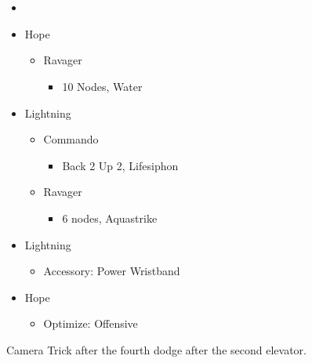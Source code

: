 \chapter[Chapter 5]{}


\renewcommand{\first}{[1] Slash \& Burn (\rav/\com)}
\renewcommand{\second}{[2] War \& Peace (\med/\com)}
\renewcommand{\third}{[3] Supersoldier (\syn/\com)}
\renewcommand{\fourth}{[4] Dualcasting (\rav/\rav)}
\renewcommand{\fifth}{[5] Dualcasting (\rav/\rav)}
\renewcommand{\sixth}{[6] Slash \& Burn (\rav/\com)}
\begin{multicols}{2}
\begin{menu}
\begin{itemize}
    \paradigm
    \begin{itemize}
        \item {}%
{\paradigmline[1]{\textit{\rav}}{\textit{\com}}{}}%
{\paradigmline{(\med)}{(\com)}{}}%
{\paradigmline{\syn}{\com}{}}%
{\paradigmline{\rav}{\rav}{}}%
{\paradigmline{\rav}{[\rav]}{}}%
{\paradigmline{[\rav]}{\com}{}}
    \end{itemize}
    \crystarium
    \begin{itemize}
        \item Hope
        \begin{itemize}
            \item Ravager
            \begin{itemize}
                \item 10 Nodes, Water
            \end{itemize}
        \end{itemize}
        \item Lightning
        \begin{itemize}
            \item Commando
            \begin{itemize}
                \item Back 2 Up 2, Lifesiphon
            \end{itemize}
            \item Ravager
            \begin{itemize}
                \item 6 nodes, Aquastrike
            \end{itemize}
        \end{itemize}
    \end{itemize}
    \equip
    \begin{itemize}
        \item Lightning
        \begin{itemize}
            \item Accessory: Power Wristband
        \end{itemize}
       \item Hope
	\begin{itemize}
		\item Optimize: Offensive
	\end{itemize}
    \end{itemize}
\end{itemize}
\end{menu}
Camera Trick after the fourth dodge after the second elevator.


\end{multicols}

